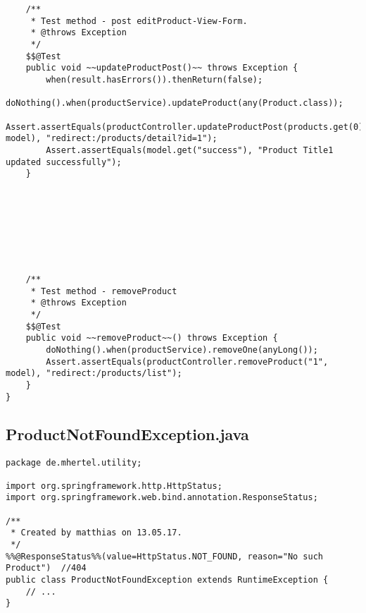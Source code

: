 \documentclass[12pt]{article}
\begin{document}
\begin{lstlisting}
    /**
     * Test method - post editProduct-View-Form.
     * @throws Exception
     */
    $$@Test
    public void ~~updateProductPost()~~ throws Exception {
        when(result.hasErrors()).thenReturn(false);
        doNothing().when(productService).updateProduct(any(Product.class));
        Assert.assertEquals(productController.updateProductPost(products.get(0), model), "redirect:/products/detail?id=1");
        Assert.assertEquals(model.get("success"), "Product Title1 updated successfully");
    }








    /**
     * Test method - removeProduct
     * @throws Exception
     */
    $$@Test
    public void ~~removeProduct~~() throws Exception {
        doNothing().when(productService).removeOne(anyLong());
        Assert.assertEquals(productController.removeProduct("1", model), "redirect:/products/list");
    }
}
\end{lstlisting}

\newpage

\subsection{ProductNotFoundException.java}

\begin{lstlisting}
package de.mhertel.utility;

import org.springframework.http.HttpStatus;
import org.springframework.web.bind.annotation.ResponseStatus;

/**
 * Created by matthias on 13.05.17.
 */
%%@ResponseStatus%%(value=HttpStatus.NOT_FOUND, reason="No such Product")  //404
public class ProductNotFoundException extends RuntimeException {
    // ...
}
\end{lstlisting}







\end{document}
